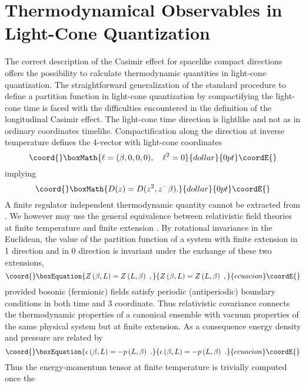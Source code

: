 \documentclass[a4paper,twocolumn,eqsecnum,aps]{revtex4}
\begin{document}

\section{Thermodynamical Observables in Light-Cone Quantization}
The correct description of the Casimir effect for spacelike compact directions offers the possibility to calculate thermodynamic quantities in light-cone quantization. The straightforward generalization of the standard procedure to define a partition function in light-cone quantization by compactifying  the  light-cone time is faced with  the difficulties encountered in the definition of the longitudinal  Casimir effect.  The light-cone time direction is lightlike  and not as in ordinary coordinates timelike. Compactification along the \coordHE{} direction at inverse temperature \myHighlight{$\beta$}\coordHE{} defines the 4-vector with light-cone coordinates 
$$\coord{}\boxMath{\ell=(\beta,0,0,0),\quad \ell^{2}=0}{dollar}{0pt}\coordE{}$$
implying 
$$\coord{}\boxMath{D(z)=D(z^2,z^{-}\beta).}{dollar}{0pt}\coordE{}$$
A finite regulator independent thermodynamic quantity cannot be extracted from \coordHE{}. 
We however may use the general equivalence between relativistic field theories at finite temperature and finite extension \cite{lt98,toms}. 
By rotational invariance in the Euclidean, the value of the
partition function of a system with finite extension \coordHE{}
in 1 direction and \myHighlight{$\beta$}\coordHE{}  in 0 direction is invariant under the
exchange
of  these two extensions,
\begin{equation}\coord{}\boxEquation{
Z\left(\beta,L\right)=Z\left(L,\beta\right) \ ,
\label{FE1}
}{
Z\left(\beta,L\right)=Z\left(L,\beta\right) \ ,
}{ecuacion}\coordE{}\end{equation}
provided bosonic (fermionic) fields satisfy periodic (antiperiodic)
boundary conditions in both time
and 3 coordinate.  Thus relativistic covariance connects the
thermodynamic properties of a canonical ensemble with 
vacuum properties of  the same physical system but at finite extension. As a consequence 
 energy density and pressure are related
by
\begin{equation}\coord{}\boxEquation{
\epsilon\left(\beta,L\right)=-p\left(L,\beta\right) \ .
\label{FE2}
}{
\epsilon\left(\beta,L\right)=-p\left(L,\beta\right) \ .
}{ecuacion}\coordE{}\end{equation}
Thus  the energy-momentum tensor at finite temperature is trivially computed once the
\end{document}
